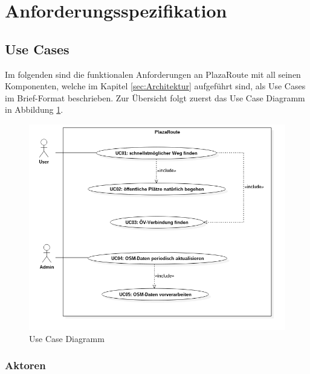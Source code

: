 \section{Anforderungsspezifikation}
\label{sec:Anforderungsspezifikation}

\subsection{Use Cases}
\label{sub:Use Cases}
Im folgenden sind die funktionalen Anforderungen an PlazaRoute mit all seinen Komponenten, welche im Kapitel \ref{sec:Architektur} aufgeführt sind, als Use Cases im Brief-Format beschrieben. Zur Übersicht folgt zuerst das Use Case Diagramm in Abbildung \ref{fig:usecase_diagram}.

\begin{figure}[ht]
\centering
\includegraphics[width=1\linewidth]{projectdoc/img/usecase_diagram}
\caption[Use Case Diagramm]{Use Case Diagramm}
\label{fig:usecase_diagram}
\end{figure}

\subsubsection{Aktoren}
\label{useccase:Aktoren}


